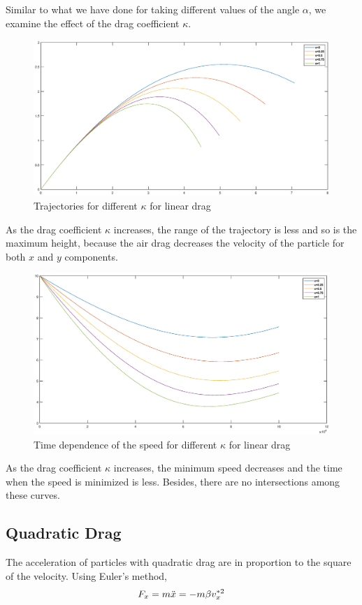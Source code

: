 \documentclass[12pt]{report}
\begin{document}
Similar to what we have done for taking different values of the angle $\alpha$, we examine the effect of the drag coefficient $\kappa$.
\begin{figure}[H]
    \centering
    \includegraphics[width=1\linewidth]{2-1-5.eps}
    \caption{Trajectories for different $\kappa$ for linear drag}
\end{figure}

As the drag coefficient $\kappa$ increases, the range of the trajectory is less and so is the maximum height, because the air drag decreases the velocity of the particle for both $x$ and $y$ components.
\begin{figure}[H]
    \centering
    \includegraphics[width=1\linewidth]{2-1-6.eps}
    \caption{Time dependence of the speed for different $\kappa$ for linear drag}
\end{figure}

As the drag coefficient $\kappa$ increases, the minimum speed decreases and the time when the speed is minimized is less. Besides, there are no intersections among these curves.
\subsection{Quadratic Drag}
The acceleration of particles with quadratic drag are in proportion to the square of the velocity. Using Euler's method,
\begin{equation}
    F_x=m\Ddot{x}=-m\beta v_x^{*2}
\end{equation}
\end{document}
